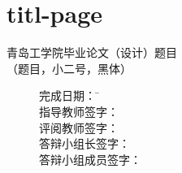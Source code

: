 \chapter{titl-page}
\thispagestyle{empty}
\begin{center}
\xiaoerhao\heiti 青岛工学院毕业论文（设计）题目 \\
\xiaosihao\songti（题目，小二号，黑体）
\begin{figure}[!b]
\setlength{\baselineskip}{35pt}
\xiaosanhao
\begin{tabbing}
 \hspace{5cm}完成日期：\hspace{2cm} \= \unline[6cm]{} \\
 \hspace{5cm}指导教师签字： \> \unline[6cm]{} \\
 \hspace{5cm}评阅教师签字： \> \unline[6cm]{} \\
 \hspace{5cm}答辩小组长签字： \> \unline[6cm]{} \\
 \hspace{5cm}答辩小组成员签字： \> \unline[6cm]{} \\ \\ \\ 
\end{tabbing}
\end{figure}
\end{center}
